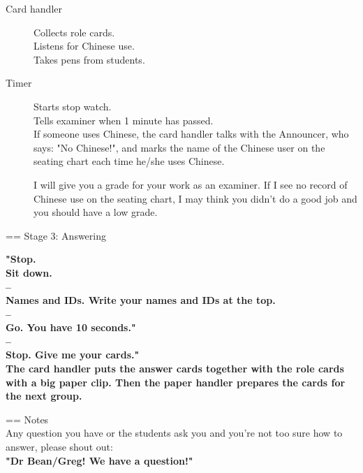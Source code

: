 \documentclass[a4paper]{article}
\begin{document}
\begin{textblock}{14}
\begin{description}
\large \mdseries
\item [Card handler]
	Collects role cards.\\
	Listens for Chinese use.\\
	Takes pens from students.\\
\item [Timer]
	Starts stop watch.\\
	Tells examiner when 1 minute has passed.\\

%

If someone uses Chinese, the card handler
talks with the Announcer, who says: "No Chinese!", and marks
the name of the Chinese user on the seating chart each time he/she uses Chinese.

I will give you a grade for your work as an examiner. If I see no record of Chinese use on the seating chart, I may think you didn't do a good job and you should have a low grade.

\end{description}

\Huge == Stage 3: Answering\\

\begin{description}

\large \mdseries
\item [Announcer]
\Large \bfseries
	"Stop.\\
	Sit down.\\
	--\\
	Names and IDs. Write your names and IDs at the top.\\
	--\\
	Go. You have 10 seconds."\\
	--\\
	Stop. Give me your cards."\\

\large \mdseries
The card handler puts the answer cards together with the role cards with a big paper clip. Then the paper handler prepares the cards for the next group.

\end{description}

\Huge == Notes\\

\large \mdseries
Any question you have or the students ask you and you're not too sure how to answer, please shout out:\\
\Huge \bfseries
	"Dr Bean/Greg! We have a question!"

\end{textblock}

\end{document}
